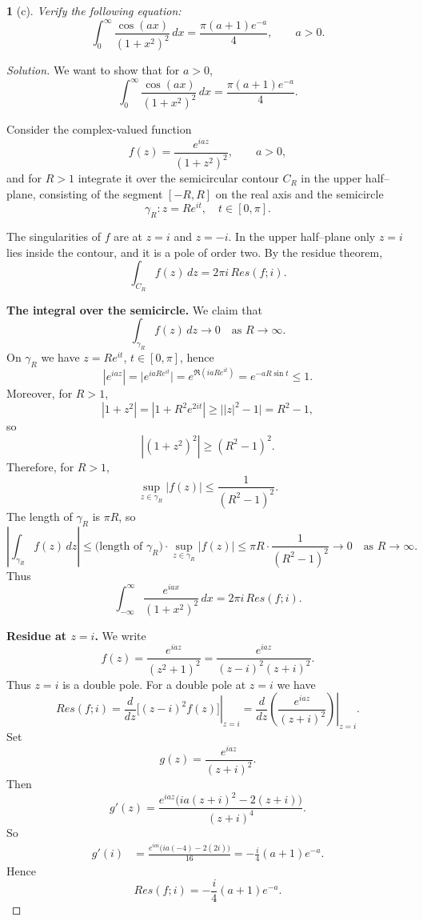 \documentclass[12pt, a4paper]{report}
\theoremstyle{spaced}
\newtheorem{exercise}{}
\newcommand{\setexercise}[1]{\setcounter{exercise}{#1-1}}
\begin{document}
\setexercise{2}
\begin{exercise}[c]
	Verify the following equation:
	\[
		\int_{0}^{\infty} \frac{\cos(ax)}{(1+x^{2})^{2}}\, dx
		= \frac{\pi (a+1)e^{-a}}{4}, \qquad a>0.
	\]
\end{exercise}

\begin{proof}[Solution]
	We want to show that for $a>0$,
	\[
		\int_{0}^{\infty} \frac{\cos(ax)}{(1+x^{2})^{2}}\, dx
		= \frac{\pi (a+1)e^{-a}}{4}.
	\]

	Consider the complex-valued function
	\[
		f(z) = \frac{e^{iaz}}{(1+z^{2})^{2}}, \qquad a>0,
	\]
	and for  \(R>1\) integrate it over the semicircular contour $C_R$ in the upper half–plane,
	consisting of the segment $[-R,R]$ on the real axis and the semicircle
	\[
		\gamma_R : z = Re^{it}, \quad t \in [0,\pi].
	\]

	The singularities of $f$ are at $z = i$ and $z = -i$. In the upper half–plane
	only $z = i$ lies inside the contour, and it is a pole of order two.
	By the residue theorem,
	\[
		\int_{C_R} f(z)\,dz = 2\pi i\,Res(f;i).
	\]

	\medskip

	\noindent\textbf{The integral over the semicircle.}
	We claim that
	\[
		\int_{\gamma_R} f(z)\,dz \longrightarrow 0 \quad \text{as } R\to\infty.
	\]
	On $\gamma_R$ we have $z = Re^{it}$, $t\in[0,\pi]$, hence
	\[
		|e^{iaz}| = \bigl|e^{iaRe^{it}}\bigr|
		= e^{\Re(i a R e^{it})}
		= e^{-aR\sin t} \le 1.
	\]
	Moreover, for $R>1$,
	\[
		|1+z^2|
		= |1+R^2 e^{2it}|
		\ge \bigl||z|^{2}-1\bigr| = R^2 - 1,
	\]
	so
	\[
		|(1+z^2)^2| \ge (R^2 - 1)^2.
	\]
	Therefore, for $R>1$,
	\[
		\sup_{z\in\gamma_R} |f(z)|
		\le \frac{1}{(R^2-1)^2}.
	\]
	The length of $\gamma_R$ is $\pi R$, so
	\[
		\left|\int_{\gamma_R} f(z)\,dz\right|
		\le \text{(length of $\gamma_R$)}\cdot \sup_{z\in\gamma_R}|f(z)|
		\le \pi R \cdot \frac{1}{(R^2-1)^2}
		\longrightarrow 0 \quad\text{as } R\to\infty.
	\]
	Thus
	\[
		\int_{-\infty}^{\infty} \frac{e^{iax}}{(1+x^{2})^{2}}\,dx
		= 2\pi i\,Res(f;i).
	\]

	\medskip

	\noindent\textbf{Residue at $z=i$.}
	We write
	\[
		f(z) = \frac{e^{iaz}}{(z^2+1)^2}
		= \frac{e^{iaz}}{(z-i)^2(z+i)^2}.
	\]
	Thus $z=i$ is a double pole. For a double pole at $z=i$ we have
	\[
		Res(f;i)
		= \left.\frac{d}{dz}\bigl[(z-i)^2 f(z)\bigr]\right|_{z=i}
		= \left.\frac{d}{dz}\left(\frac{e^{iaz}}{(z+i)^2}\right)\right|_{z=i}.
	\]
	Set
	\[
		g(z) = \frac{e^{iaz}}{(z+i)^2}.
	\]
	Then
	\[
		g'(z)
		= \frac{e^{iaz}\big(ia(z+i)^2 - 2(z+i)\big)}{(z+i)^4}.
	\]
	So
	\begin{align*}
		g'(i)
		 & = \frac{e^{iai}\big(ia(-4) - 2(2i)\big)}{16}
		= -\frac{i}{4}(a+1)e^{-a}.
	\end{align*}
	Hence
	\[
		Res(f;i) = -\frac{i}{4}(a+1)e^{-a}.
	\]


\end{proof}
\end{document}
